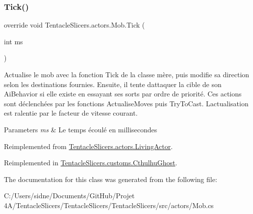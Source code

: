 \mbox{\label{class_tentacle_slicers_1_1actors_1_1_mob_ad3e79cfdf2a28f8eb6363f0567bdcaaf}} 
\subsubsection{\texorpdfstring{Tick()}{Tick()}}
{\footnotesize\ttfamily override void Tentacle\+Slicers.\+actors.\+Mob.\+Tick (\begin{DoxyParamCaption}\item[{int}]{ms }\end{DoxyParamCaption})\hspace{0.3cm}{\ttfamily [virtual]}}



Actualise le mob avec la fonction Tick de la classe mère, puis modifie sa direction selon les destinations fournies. Ensuite, il tente d\textquotesingle{}attaquer la cible de son Ai\+Behavior si elle existe en essayant ses sorts par ordre de priorité. Ces actions sont déclenchées par les fonctions Actualise\+Moves puis Try\+To\+Cast. L\textquotesingle{}actualisation est ralentie par le facteur de vitesse courant. 


\begin{DoxyParams}{Parameters}
{\em ms} & Le temps écoulé en millisecondes \\
\hline
\end{DoxyParams}


Reimplemented from \hyperlink{class_tentacle_slicers_1_1actors_1_1_living_actor_a1697e3d67782b4df99e48a333a138935}{Tentacle\+Slicers.\+actors.\+Living\+Actor}.



Reimplemented in \hyperlink{class_tentacle_slicers_1_1customs_1_1_cthulhu_ghost_a402aea79e343f8f5a1b153a143edf9fb}{Tentacle\+Slicers.\+customs.\+Cthulhu\+Ghost}.



The documentation for this class was generated from the following file\+:\begin{DoxyCompactItemize}
\item 
C\+:/\+Users/sidne/\+Documents/\+Git\+Hub/\+Projet 4\+A/\+Tentacle\+Slicers/\+Tentacle\+Slicers/\+Tentacle\+Slicers/src/actors/Mob.\+cs\end{DoxyCompactItemize}
